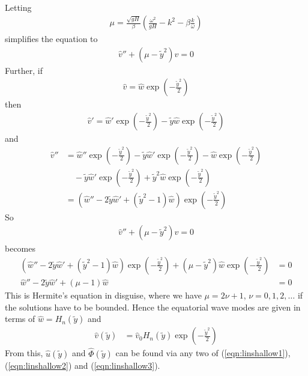 \begin{solution}
\begin{align}
\end{align}
Letting 
\begin{align}
\mu = \frac{\sqrt{gH}}{\beta}\left(\frac{\omega^2}{gH} - k^2 - \beta\frac{k}{\omega}\right)
\end{align}
simplifies the equation to 
\begin{align}
\hat{v}'' + (\mu - \tilde{y}^2)\hat{v} = 0    
\end{align}
Further, if
\begin{align}
\hat{v} = \hat{w} \exp(-\frac{\tilde{y}^2}{2})
\end{align}
then 
\begin{align}
\hat{v}' = \hat{w}' \exp(-\frac{\tilde{y}^2}{2}) - \tilde{y}\hat{w} \exp(-\frac{\tilde{y}^2}{2})
\end{align}
and
\begin{align}
\hat{v}'' &= \hat{w}'' \exp(-\frac{\tilde{y}^2}{2}) - \tilde{y}\hat{w}' \exp(-\frac{\tilde{y}^2}{2}) - \hat{w} \exp(-\frac{\tilde{y}^2}{2}) \nonumber \\
&\quad - \tilde{y}\hat{w}' \exp(-\frac{\tilde{y}^2}{2}) + \tilde{y}^2\hat{w} \exp(-\frac{\tilde{y}^2}{2}) \nonumber \\
&= (\hat{w}'' - 2\tilde{y}\hat{w}' + (\tilde{y}^2-1)\hat{w})\exp(-\frac{\tilde{y}^2}{2})
\end{align}
So
\begin{align}
\hat{v}'' + (\mu - \tilde{y}^2)\hat{v} = 0
\end{align}
becomes
\begin{align}
(\hat{w}'' - 2\tilde{y}\hat{w}' + (\tilde{y}^2-1)\hat{w})\exp(-\frac{\tilde{y}^2}{2}) + (\mu - \tilde{y}^2)\hat{w} \exp(-\frac{\tilde{y}^2}{2}) &= 0 \nonumber \\
\hat{w}'' - 2\tilde{y}\hat{w}' + (\mu-1)\hat{w} &= 0
\end{align}
This is Hermite's equation in disguise, where we have $\mu = 2\nu + 1$, $\nu = 0, 1, 2, \ldots$ if the solutions have to be bounded. Hence the equatorial wave modes are given in terms of $\hat{w} = H_n(\tilde{y})$ and
\begin{align}
\hat{v}(\tilde{y}) &= \hat{v}_0H_n(\tilde{y})\exp(-\frac{\tilde{y}^2}{2})    
\end{align}
From this, $\hat{u}(\tilde{y})$ and $\hat{\Phi}(\tilde{y})$ can be found via any two of (\ref{eqn:linshallow1}), (\ref{eqn:linshallow2}) and (\ref{eqn:linshallow3}).
\end{solution}
